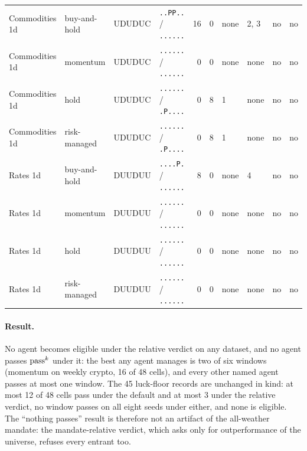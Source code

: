 \begin{table}[t]
\begin{tabular}{llllrrllcc}
Commodities 1d & buy-and-hold & UDUDUC & \texttt{..PP..} / \texttt{......} & 16 & 0 & none & 2, 3 & no & no \\
Commodities 1d & momentum & UDUDUC & \texttt{......} / \texttt{......} & 0 & 0 & none & none & no & no \\
Commodities 1d & hold & UDUDUC & \texttt{......} / \texttt{.P....} & 0 & 8 & 1 & none & no & no \\
Commodities 1d & risk-managed & UDUDUC & \texttt{......} / \texttt{.P....} & 0 & 8 & 1 & none & no & no \\
Rates 1d & buy-and-hold & DUUDUU & \texttt{....P.} / \texttt{......} & 8 & 0 & none & 4 & no & no \\
Rates 1d & momentum & DUUDUU & \texttt{......} / \texttt{......} & 0 & 0 & none & none & no & no \\
Rates 1d & hold & DUUDUU & \texttt{......} / \texttt{......} & 0 & 0 & none & none & no & no \\
Rates 1d & risk-managed & DUUDUU & \texttt{......} / \texttt{......} & 0 & 0 & none & none & no & no \\
\bottomrule
\end{tabular}
\end{table}

\paragraph{Result.} No agent becomes eligible under the relative verdict on any dataset, and no agent passes $\text{pass}^{k}$ under it: the best any agent manages is two of six windows (momentum on weekly crypto, 16 of 48 cells), and every other named agent passes at most one window. The 45 luck-floor records are unchanged in kind: at most 12 of 48 cells pass under the default and at most 3 under the relative verdict, no window passes on all eight seeds under either, and none is eligible. The ``nothing passes'' result is therefore not an artifact of the all-weather mandate: the mandate-relative verdict, which asks only for outperformance of the universe, refuses every entrant too.

